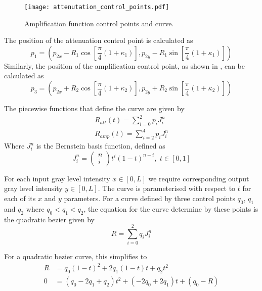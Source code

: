 \begin{definition}
\begin{figure}[!t]
{			\texttt{[image: attenutation\_control\_points.pdf]}
			\label{fig:ampcontrolpoints}
		}	
		\caption{Amplification function control points and curve.}
		\label{fig:ampcalculation}
	\end{figure}

	The position of the attenuation control point is calculated as
	\begin{equation*}
		{p_1} = \left(
		p_{2x} - R_1\cos[\frac{\pi}{4}(1+\kappa_1)],
		p_{2y} - R_1\sin[\frac{\pi}{4}(1+\kappa_1)]
		\right)
	\end{equation*}
	Similarly, the position of the amplification control point, as shown in , can be calculated as
	\begin{equation*}
		{p_3} = \left(
		p_{2x} + R_2\cos[\frac{\pi}{4}(1+\kappa_2)],
		p_{2y} + R_2\sin[\frac{\pi}{4}(1+\kappa_2)]
		\right)
	\end{equation*}
	
	The piecewise functions that define the curve are given by	
	\begin{eqnarray}
		R_{att}(t) = \sum_{i=0}^2 p_i J_i^n \\
		R_{amp}(t) = \sum_{i=2}^4 p_i J_i^n
	\end{eqnarray}
	Where $J_i^n$ is the Bernstein basis function, defined as
	\begin{equation}
	J_i^n = \begin{pmatrix}
	n \\
	i
	\end{pmatrix}	
	t^i(1-t)^{n-i}, \,\, t \in [0,1]
	\label{eq:bernsteinbasis}
	\end{equation}
	
	For each input gray level intensity $x \in [0, L]$ we require corresponding output gray level intensity $y \in [0, L]$.
	The curve is parameterised with respect to $t$ for each of its $x$ and $y$ parameters.
	For a curve defined by three control points $q_0$, $q_1$ and $q_2$ where $q_0 < q_1 < q_2$, the equation for the curve determine by these points is the quadratic bezier given by
	\begin{equation}
		R = \sum_{i=0}^2 q_i J_i^n
	\end{equation}
	
	For a quadratic bezier curve, this simplifies to
	\begin{align*}
		R &= q_0(1-t)^2 + 2q_1(1-t)t + q_2t^2 \\
		0 &= (q_0-2q_1+q_2)t^2 + (-2q_0+2q_1)t + (q_0-R)
	\end{align*}
	

\end{definition}
